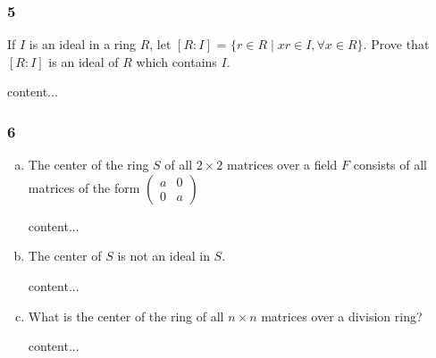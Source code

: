 \subsubsection*{5}
\begin{graybox}
	If $I$ is an ideal in a ring $R$, let $[R:I]$ = $\{r \in R \mid xr \in I, \forall x \in R\}$. Prove that $[R:I]$ is an ideal of $R$ which contains $I$.
\end{graybox}
\begin{solution}
	content...
\end{solution}

\subsubsection*{6}
\begin{enumerate}[(a)]
	\item
	\begin{graybox}
		The center of the ring $S$ of all $2\times 2$ matrices over a field $F$ consists of all matrices of the form 
		$
		\begin{pmatrix}
			a & 0\\
			0 & a
		\end{pmatrix}
		$
	\end{graybox}
	\begin{solution}
		content...
	\end{solution}
	
	\item
	\begin{graybox}
		The center of $S$ is not an ideal in $S$.
	\end{graybox}
	\begin{solution}
		content...
	\end{solution}
	
	\item
	\begin{graybox}
		What is the center of the ring of all $n \times n$ matrices over a division ring?
	\end{graybox}
	\begin{solution}
		content...
	\end{solution}
\end{enumerate}

